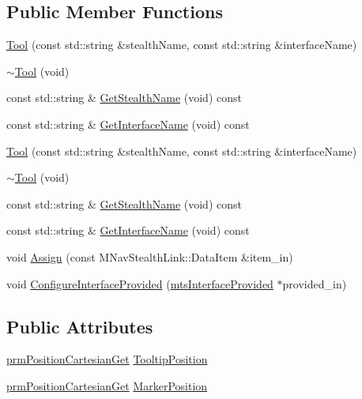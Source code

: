 \subsection*{Public Member Functions}
\begin{DoxyCompactItemize}
\item 
\hyperlink{classmts_medtronic_stealthlink_1_1_tool_a5dcdf7314253cf8a4c34894320a995d5}{Tool} (const std\+::string \&stealth\+Name, const std\+::string \&interface\+Name)
\item 
\hyperlink{classmts_medtronic_stealthlink_1_1_tool_ac161860a5f800b2442e224cbe05d1a9d}{$\sim$\+Tool} (void)
\item 
const std\+::string \& \hyperlink{classmts_medtronic_stealthlink_1_1_tool_a94202828748d5ec14f3bac3986fedf9d}{Get\+Stealth\+Name} (void) const 
\item 
const std\+::string \& \hyperlink{classmts_medtronic_stealthlink_1_1_tool_a715888355806a4f9c0a369cf28175a46}{Get\+Interface\+Name} (void) const 
\item 
\hyperlink{classmts_medtronic_stealthlink_1_1_tool_a5dcdf7314253cf8a4c34894320a995d5}{Tool} (const std\+::string \&stealth\+Name, const std\+::string \&interface\+Name)
\item 
\hyperlink{classmts_medtronic_stealthlink_1_1_tool_ac161860a5f800b2442e224cbe05d1a9d}{$\sim$\+Tool} (void)
\item 
const std\+::string \& \hyperlink{classmts_medtronic_stealthlink_1_1_tool_a94202828748d5ec14f3bac3986fedf9d}{Get\+Stealth\+Name} (void) const 
\item 
const std\+::string \& \hyperlink{classmts_medtronic_stealthlink_1_1_tool_a715888355806a4f9c0a369cf28175a46}{Get\+Interface\+Name} (void) const 
\item 
void \hyperlink{classmts_medtronic_stealthlink_1_1_tool_a2a147aab96afb4ccdb351cc9756e96ff}{Assign} (const M\+Nav\+Stealth\+Link\+::\+Data\+Item \&item\+\_\+in)
\item 
void \hyperlink{classmts_medtronic_stealthlink_1_1_tool_a30c49ba6f30cd8b0528969d2d5faacdc}{Configure\+Interface\+Provided} (\hyperlink{classmts_interface_provided}{mts\+Interface\+Provided} $\ast$provided\+\_\+in)
\end{DoxyCompactItemize}
\subsection*{Public Attributes}
\begin{DoxyCompactItemize}
\item 
\hyperlink{classprm_position_cartesian_get}{prm\+Position\+Cartesian\+Get} \hyperlink{classmts_medtronic_stealthlink_1_1_tool_acf9d37a43587bf06a4b596d77feabd9f}{Tooltip\+Position}
\item 
\hyperlink{classprm_position_cartesian_get}{prm\+Position\+Cartesian\+Get} \hyperlink{classmts_medtronic_stealthlink_1_1_tool_ac1e88de569626cdb66f345ebeffc6228}{Marker\+Position}
\end{DoxyCompactItemize}
